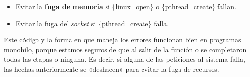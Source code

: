 \begin{Shaded}
\begin{Highlighting}[]
\OperatorTok{*}\OperatorTok{(}  \OperatorTok{)}
\OperatorTok{\{}
\OperatorTok{*}\OperatorTok{=}\OperatorTok{(} \OperatorTok{(}\OperatorTok{)} \OperatorTok{);}
    \OperatorTok{(}\OperatorTok{==}\OperatorTok{)}
    \OperatorTok{\{}
        \OperatorTok{;}
    \OperatorTok{\}}

\OperatorTok{{-}\textgreater{}}\OperatorTok{=}\OperatorTok{(}  \OperatorTok{);}
     \OperatorTok{(}\OperatorTok{\textless{}} \OperatorTok{)}
    \OperatorTok{\{}
\OperatorTok{(}\OperatorTok{);} 
        \OperatorTok{;}
    \OperatorTok{\}}

    \OperatorTok{=}\OperatorTok{(\&}\OperatorTok{{-}\textgreater{}}\OperatorTok{,} \OperatorTok{,}\OperatorTok{);}
     \OperatorTok{(}\OperatorTok{)}
    \OperatorTok{\{}
\OperatorTok{(}\OperatorTok{{-}\textgreater{}}\OperatorTok{);} 
\OperatorTok{(}\OperatorTok{);} 
        \OperatorTok{;}
    \OperatorTok{\}}

    \OperatorTok{;}
\OperatorTok{\}}
\end{Highlighting}
\end{Shaded}

\begin{itemize}
\item
  Evitar la \textbf{fuga de memoria} si \{linux\_open\} o
  \{pthread\_create\} fallan.
\item
  Evitar la fuga del \emph{socket} si \{pthread\_create\} falla.
\end{itemize}

Este código y la forma en que maneja los errores funcionan bien en
programas monohilo, porque estamos seguros de que al salir de la función
o se completaron todas las etapas o ninguna. Es decir, si alguna de las
peticiones al sistema falla, las hechas anteriormente se «deshacen» para
evitar la fuga de recursos.


